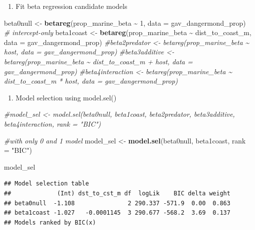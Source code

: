 \documentclass[
]{article}
\newenvironment{Shaded}{\begin{snugshade}}{\end{snugshade}}
\newcommand{\AttributeTok}[1]{\textcolor[rgb]{0.13,0.29,0.53}{#1}}
\newcommand{\CommentTok}[1]{\textcolor[rgb]{0.56,0.35,0.01}{\textit{#1}}}
\newcommand{\DecValTok}[1]{\textcolor[rgb]{0.00,0.00,0.81}{#1}}
\newcommand{\FunctionTok}[1]{\textcolor[rgb]{0.13,0.29,0.53}{\textbf{#1}}}
\newcommand{\NormalTok}[1]{#1}
\newcommand{\OtherTok}[1]{\textcolor[rgb]{0.56,0.35,0.01}{#1}}
\newcommand{\SpecialCharTok}[1]{\textcolor[rgb]{0.81,0.36,0.00}{\textbf{#1}}}
\newcommand{\StringTok}[1]{\textcolor[rgb]{0.31,0.60,0.02}{#1}}
\providecommand{\tightlist}{%
  \setlength{\itemsep}{0pt}\setlength{\parskip}{0pt}}
\begin{document}
\begin{enumerate}
\def\labelenumi{\arabic{enumi}.}
\setcounter{enumi}{1}
\tightlist
\item
  Fit beta regression candidate models
\end{enumerate}

\begin{Shaded}
\begin{Highlighting}[]
\NormalTok{beta0null }\OtherTok{\textless{}{-}} \FunctionTok{betareg}\NormalTok{(prop\_marine\_beta }\SpecialCharTok{\textasciitilde{}} \DecValTok{1}\NormalTok{, }\AttributeTok{data =}\NormalTok{ gav\_dangermond\_prop)  }\CommentTok{\# intercept{-}only}
\NormalTok{beta1coast }\OtherTok{\textless{}{-}} \FunctionTok{betareg}\NormalTok{(prop\_marine\_beta }\SpecialCharTok{\textasciitilde{}}\NormalTok{ dist\_to\_coast\_m, }\AttributeTok{data =}\NormalTok{ gav\_dangermond\_prop)}
\CommentTok{\#beta2predator \textless{}{-} betareg(prop\_marine\_beta \textasciitilde{} host, data = gav\_dangermond\_prop)}
\CommentTok{\#beta3additive \textless{}{-} betareg(prop\_marine\_beta \textasciitilde{} dist\_to\_coast\_m + host, data = gav\_dangermond\_prop)}
\CommentTok{\#beta4interaction \textless{}{-} betareg(prop\_marine\_beta \textasciitilde{} dist\_to\_coast\_m * host, data = gav\_dangermond\_prop)}
\end{Highlighting}
\end{Shaded}

\begin{enumerate}
\def\labelenumi{\arabic{enumi}.}
\setcounter{enumi}{2}
\tightlist
\item
  Model selection using model.sel()
\end{enumerate}

\begin{Shaded}
\begin{Highlighting}[]
\CommentTok{\#model\_sel \textless{}{-} model.sel(beta0null, beta1coast, beta2predator, beta3additive, beta4interaction, rank = "BIC")}

\CommentTok{\#with only 0 and 1 model }
\NormalTok{model\_sel }\OtherTok{\textless{}{-}} \FunctionTok{model.sel}\NormalTok{(beta0null, beta1coast, }\AttributeTok{rank =} \StringTok{"BIC"}\NormalTok{)}

\NormalTok{model\_sel}
\end{Highlighting}
\end{Shaded}

\begin{verbatim}
## Model selection table 
##             (Int) dst_to_cst_m df  logLik    BIC delta weight
## beta0null  -1.108               2 290.337 -571.9  0.00  0.863
## beta1coast -1.027   -0.0001145  3 290.677 -568.2  3.69  0.137
## Models ranked by BIC(x)
\end{verbatim}
\end{document}
